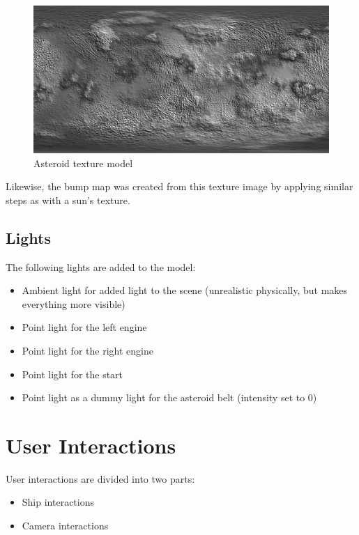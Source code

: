\documentclass[12pt,a4paper]{report}
\begin{document}
 	\begin{figure}[H]
 		\centering
 		\includegraphics[width=0.9\linewidth]{img/asteroid}
 		\caption{Asteroid texture model}
 		\label{fig:asteroid}
 	\end{figure}
 
 	Likewise, the bump map was created from this texture image by applying similar steps as with a sun's texture.	
 	
 	\subsection{Lights}
 	
 	The following lights are added to the model:
 	
 	\begin{itemize}
 		\item Ambient light for added light to the scene (unrealistic physically, but makes everything more visible)
 		\item Point light for the left engine
 		\item Point light for the right engine
 		\item Point light for the start
 		\item Point light as a dummy light for the asteroid belt (intensity set to 0)
 	\end{itemize}
	
	\section{User Interactions}
	
	User interactions are divided into two parts:
	
	\begin{itemize}
		\item Ship interactions
		\item Camera interactions
	\end{itemize}
\end{document}
